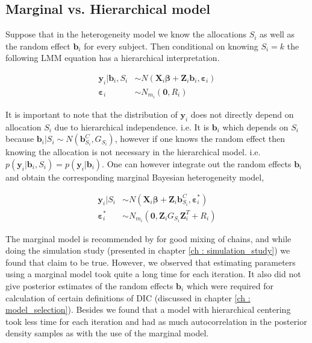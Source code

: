 \subsection{Marginal vs. Hierarchical model}
Suppose that in the heterogeneity model we know the allocations $S_i$ as well as the random effect $\boldsymbol{b}_i$ for every subject. Then conditional on knowing $S_i=k$ the following LMM equation has a hierarchical interpretation.

\begin{equation}
\begin{split}
\boldsymbol{y}_i|\boldsymbol{b}_{i}, S_i &\sim N(\boldsymbol{X}_{i}\boldsymbol{\beta} + \boldsymbol{Z}_{i}\boldsymbol{b}_{i},\boldsymbol{\varepsilon}_{i})\\ 
\boldsymbol{\varepsilon}_{i} &\sim N_{m_i}(\boldsymbol{0}, R_i)
\end{split}
\end{equation}

It is important to note that the distribution of $\boldsymbol{y}_i$ does not directly depend on allocation $S_i$ due to hierarchical independence. i.e. It is $\boldsymbol{b}_{i}$ which depends on $S_i$ because $\boldsymbol{b}_{i}|S_i \sim N(\boldsymbol{b}_{S_i}^C, G_{S_i})$, however if one knows the random effect then knowing the allocation is not necessary in the hierarchical model. i.e. $p(\boldsymbol{y}_i|\boldsymbol{b}_{i}, S_i) = p(\boldsymbol{y}_i|\boldsymbol{b}_{i})$. One can however integrate out the random effects $\boldsymbol{b}_{i}$ and obtain the corresponding marginal Bayesian heterogeneity model,

\begin{equation}
\begin{split}
\boldsymbol{y}_i|S_i &\sim N(\boldsymbol{X}_{i}\boldsymbol{\beta} + \boldsymbol{Z}_{i}\boldsymbol{b}_{S_i}^C, \boldsymbol{\varepsilon}_{i}^*)\\ 
\boldsymbol{\varepsilon}_{i}^* &\sim N_{m_i}(\boldsymbol{0}, \boldsymbol{Z}_{i}G_{S_i}\boldsymbol{Z}_{i}^T+ R_i)
\end{split}
\end{equation}

The marginal model is recommended by \citet{fruhwirth-schnatter_bayesian_2004} for good mixing of chains, and while doing the simulation study (presented in chapter \ref{ch : simulation_study}) we found that claim to be true. However, we observed that estimating parameters using a marginal model took quite a long time for each iteration. It also did not give posterior estimates of the random effects $\boldsymbol{b}_i$ which were required for calculation of certain definitions of DIC (discussed in chapter \ref{ch : model_selection}). Besides we found that a model with hierarchical centering took less time for each iteration and had as much autocorrelation in the posterior density samples as with the use of the marginal model.

